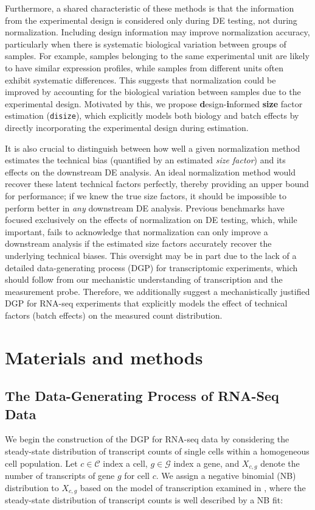 \documentclass[10pt,letterpaper]{article}
\begin{document}
Furthermore, a shared characteristic of these methods is that the information from the experimental design is considered only during DE testing, not during normalization.
Including design information may improve normalization accuracy, particularly when there is systematic biological variation between groups of samples.
For example, samples belonging to the same experimental unit are likely to have similar expression profiles, while samples from different units often exhibit systematic differences.
This suggests that normalization could be improved by accounting for the biological variation between samples due to the experimental design.
Motivated by this, we propose \textbf{d}esign-\textbf{i}nformed \textbf{size} factor estimation (\texttt{disize}), which explicitly models both biology and batch effects by directly incorporating the experimental design during estimation.

It is also crucial to distinguish between how well a given normalization method estimates the technical bias (quantified by an estimated \textit{size factor}) and its effects on the downstream DE analysis.
An ideal normalization method would recover these latent technical factors perfectly, thereby providing an upper bound for performance; if we knew the true size factors, it should be impossible to perform better in \textit{any} downstream DE analysis.
Previous benchmarks have focused exclusively on the effects of normalization on DE testing, which, while important, fails to acknowledge that normalization can only improve a downstream analysis if the estimated size factors accurately recover the underlying technical biases.
This oversight may be in part due to the lack of a detailed data-generating process (DGP) for transcriptomic experiments, which should follow from our mechanistic understanding of transcription and the measurement probe.
Therefore, we additionally suggest a mechanistically justified DGP for RNA-seq experiments that explicitly models the effect of technical factors (batch effects) on the measured count distribution.

\section*{Materials and methods}
\subsection*{The Data-Generating Process of RNA-Seq Data}

We begin the construction of the DGP for RNA-seq data by considering the steady-state distribution of transcript counts of single cells within a homogeneous cell population.
Let $c \in \mathcal{C}$ index a cell, $g \in \mathcal{G}$ index a gene, and $X_{c,g}$ denote the number of transcripts of gene $g$ for cell $c$.
We assign a negative binomial (NB) distribution to $X_{c,g}$ based on the model of transcription examined in \cite{corrigan_continuum_2016}, where the steady-state distribution of transcript counts is well described by a NB fit:
\end{document}
